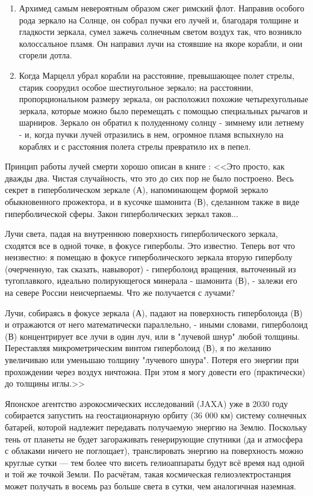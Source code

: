 \documentclass[14pt,a4paper]{extarticle} %
\begin{document}
\begin{enumerate}
    \item Архимед самым невероятным образом сжег римский флот. Направив особого рода зеркало на Солнце, он собрал пучки его лучей и, благодаря толщине и гладкости зеркала, сумел зажечь солнечным светом воздух так, что возникло колоссальное пламя. Он направил лучи на стоявшие на якоре корабли, и они сгорели дотла.
    \item Когда Марцелл убрал корабли на расстояние, превышающее полет стрелы, старик соорудил особое шестиугольное зеркало; на расстоянии, пропорциональном размеру зеркала, он расположил похожие четырехугольные зеркала, которые можно было перемещать с помощью специальных рычагов и шарниров. Зеркало он обратил к полуденному солнцу - зимнему или летнему - и, когда пучки лучей отразились в нем, огромное пламя вспыхнуло на кораблях и с расстояния полета стрелы превратило их в пепел.
\end{enumerate}

Принцип работы лучей смерти хорошо описан в книге \cite{bib:tolstoy}:
<<Это просто, как дважды два. Чистая случайность, что это до сих пор не было построено. Весь секрет в гиперболическом зеркале (А), напоминающем формой зеркало обыкновенного прожектора, и в кусочке шамонита (В), сделанном также в виде гиперболической сферы. Закон гиперболических зеркал таков...

Лучи света, падая на внутреннюю поверхность гиперболического зеркала, сходятся все в одной точке, в фокусе гиперболы. Это известно. Теперь вот что неизвестно: я помещаю в фокусе гиперболического зеркала вторую гиперболу (очерченную, так сказать, навыворот) - гиперболоид вращения, выточенный из тугоплавкого, идеально полирующегося минерала - шамонита (В), - залежи его на севере России неисчерпаемы. Что же получается с лучами?

Лучи, собираясь в фокусе зеркала (А), падают на поверхность гиперболоида (В) и отражаются от него математически параллельно, - иными словами, гиперболоид (В) концентрирует все лучи в один луч, или в "лучевой шнур" любой толщины. Переставляя микрометрическим винтом гиперболоид (В), я по желанию увеличиваю или уменьшаю толщину "лучевого шнура". Потеря его энергии при прохождении через воздух ничтожна. При этом я могу довести его (практически) до толщины иглы.>>

Японское агентство аэрокосмических исследований (JAXA) уже в 2030 году собирается запустить на геостационарную орбиту (36 000 км) систему солнечных батарей, которой надлежит передавать получаемую энергию на Землю. Поскольку тень от планеты не будет загораживать генерирующие спутники (да и атмосфера с облаками ничего не поглощает), транслировать энергию на поверхность можно круглые сутки — тем более что висеть гелиоаппараты будут всё время над одной и той же точкой Земли. По расчётам, такая космическая гелиоэлектростанция может получать в восемь раз больше света в сутки, чем аналогичная наземная.
\end{document}
